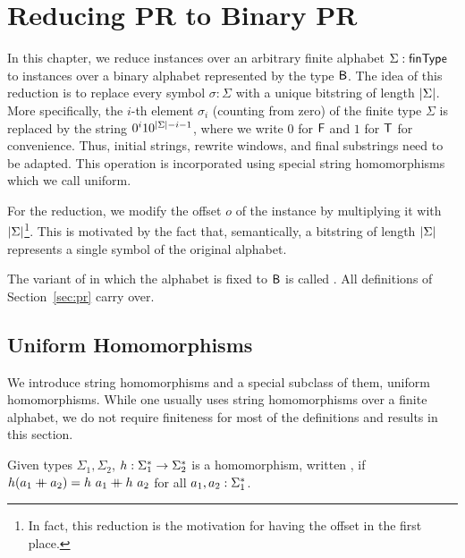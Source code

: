 \newcommand{\strentD}[1]{\ensuremath{\rightsquigarrow^D}}
\newcommand{\FlatPR}{\textbf{FlatPR}}

\chapter{Reducing PR to Binary PR}\label{chap:pr_bpr}
In this chapter, we reduce \PR{} instances over an arbitrary finite alphabet $\Sigma : \textsf{finType}$ to instances over a binary alphabet represented by the type $\textsf{B}$. The idea of this reduction is to replace every symbol $\sigma : \Sigma$ with a unique bitstring of length $|\Sigma|$.
More specifically, the $i$-th element $\sigma_i$ (counting from zero) of the finite type $\Sigma$ is replaced by the string $0^i10^{|\Sigma|-i-1}$, where we write $0$ for $\mathsf{F}$ and $1$ for $\mathsf{T}$ for convenience.
Thus, initial strings, rewrite windows, and final substrings need to be adapted.
This operation is incorporated using special string homomorphisms which we call uniform.

For the reduction, we modify the offset $o$ of the \PR{} instance by multiplying it with $|\Sigma|$\footnote{In fact, this reduction is the motivation for having the offset in the first place.}. This is motivated by the fact that, semantically, a bitstring of length $|\Sigma|$ represents a single symbol of the original alphabet.

The variant of \PR{} in which the alphabet is fixed to $\textsf{B}$ is called \BPR{}. All definitions of Section~\ref{sec:pr} carry over.

\section{Uniform Homomorphisms}
We introduce string homomorphisms and a special subclass of them, uniform homomorphisms.
While one usually uses string homomorphisms over a finite alphabet, we do not require finiteness for most of the definitions and results in this section.

\newcommand{\homomorphism}{\textsf{homomorphism}}
\begin{definition}
  Given types $\Sigma_1, \Sigma_2$, $h : \Sigma_1^* \rightarrow \Sigma_2^*$ is a homomorphism, written \mnotec[homomorphism]{$\homomorphism~h$}, if $h (a_1 \mathbin{+\mkern-10mu+} a_2) = h~a_1 \mathbin{+\mkern-10mu+} h~a_2$ for all $a_1, a_2 : \Sigma_1^*$. 
\end{definition}


